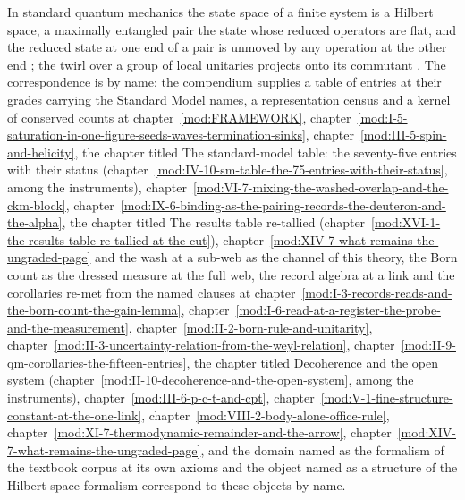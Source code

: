 \begin{chbridge}
In standard quantum mechanics the state space of a finite system is a Hilbert space, a maximally entangled pair the state whose reduced operators are flat, and the reduced state at one end of a pair is unmoved by any operation at the other end \cite{Nielsen2000}; the twirl over a group of local unitaries projects onto its commutant \cite{Horodecki2009}. The correspondence is by name: the compendium supplies a table of entries at their grades carrying the Standard Model names, a representation census and a kernel of conserved counts at chapter~\ref{mod:FRAMEWORK}, chapter~\ref{mod:I-5-saturation-in-one-figure-seeds-waves-termination-sinks}, chapter~\ref{mod:III-5-spin-and-helicity}, the chapter titled The standard-model table: the seventy-five entries with their status (chapter~\ref{mod:IV-10-sm-table-the-75-entries-with-their-status}, among the instruments), chapter~\ref{mod:VI-7-mixing-the-washed-overlap-and-the-ckm-block}, chapter~\ref{mod:IX-6-binding-as-the-pairing-records-the-deuteron-and-the-alpha}, the chapter titled The results table re-tallied (chapter~\ref{mod:XVI-1-the-results-table-re-tallied-at-the-cut}), chapter~\ref{mod:XIV-7-what-remains-the-ungraded-page} and the wash at a sub-web as the channel of this theory, the Born count as the dressed measure at the full web, the record algebra at a link and the corollaries re-met from the named clauses at chapter~\ref{mod:I-3-records-reads-and-the-born-count-the-gain-lemma}, chapter~\ref{mod:I-6-read-at-a-register-the-probe-and-the-measurement}, chapter~\ref{mod:II-2-born-rule-and-unitarity}, chapter~\ref{mod:II-3-uncertainty-relation-from-the-weyl-relation}, chapter~\ref{mod:II-9-qm-corollaries-the-fifteen-entries}, the chapter titled Decoherence and the open system (chapter~\ref{mod:II-10-decoherence-and-the-open-system}, among the instruments), chapter~\ref{mod:III-6-p-c-t-and-cpt}, chapter~\ref{mod:V-1-fine-structure-constant-at-the-one-link}, chapter~\ref{mod:VIII-2-body-alone-office-rule}, chapter~\ref{mod:XI-7-thermodynamic-remainder-and-the-arrow}, chapter~\ref{mod:XIV-7-what-remains-the-ungraded-page}, and the domain named as the formalism of the textbook corpus at its own axioms and the object named as a structure of the Hilbert-space formalism correspond to these objects by name.
\end{chbridge}
